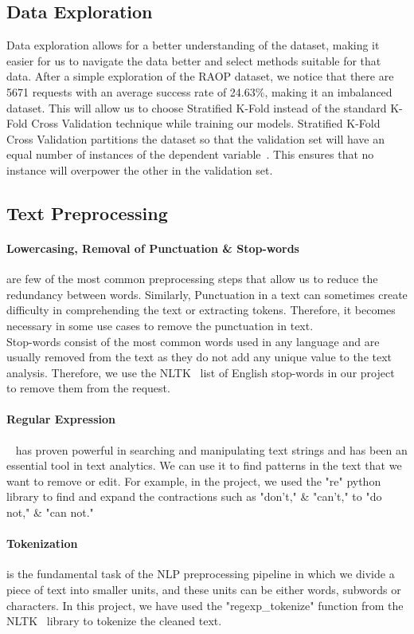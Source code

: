 \documentclass[runningheads]{llncs}
\begin{document}
\subsection{Data Exploration}
Data exploration allows for a better understanding of the dataset, making it easier for us to navigate the data better and select methods suitable for that data. After a simple exploration of the RAOP dataset, we notice that there are 5671 requests with an average success rate of 24.63\%, making it an imbalanced dataset. This will allow us to choose Stratified K-Fold instead of the standard K-Fold Cross Validation technique while training our models. Stratified K-Fold Cross Validation partitions the dataset so that the validation set will have an equal number of instances of the dependent variable~\cite{strat_kfold}. This ensures that no instance will overpower the other in the validation set.

\subsection{Text Preprocessing}
\paragraph{Lowercasing, Removal of Punctuation \& Stop-words}
are few of the most common preprocessing steps that allow us to reduce the redundancy between words. Similarly, Punctuation in a text can sometimes create difficulty in comprehending the text or extracting tokens. Therefore, it becomes necessary in some use cases to remove the punctuation in text.\\
Stop-words consist of the most common words used in any language and are usually removed from the text as they do not add any unique value to the text analysis. Therefore, we use the NLTK~\cite{nltk} list of English stop-words in our project to remove them from the request.
\paragraph{Regular Expression}~\cite{regex} has proven powerful in searching and manipulating text strings and has been an essential tool in text analytics. We can use it to find patterns in the text that we want to remove or edit. For example, in the project, we used the "re" python library to find and expand the contractions such as "don't," \& "can't," to "do not," \& "can not."
\paragraph{Tokenization} is the fundamental task of the NLP preprocessing pipeline in which we divide a piece of text into smaller units, and these units can be either words, subwords or characters. In this project, we have used the "regexp\_tokenize" function from the NLTK~\cite{nltk} library to tokenize the cleaned text.
\end{document}
